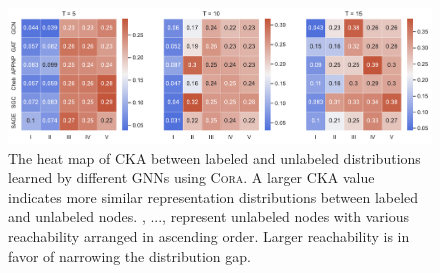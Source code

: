 \documentclass[letterpaper]{article} %
\newcommand{\roma}[1]{\uppercase\expandafter{\romannumeral#1}}
\begin{document}
\begin{figure}[!ht]
	\centering
    \includegraphics[width=0.95\linewidth]{figs/cka.pdf}
    \caption{The heat map of CKA between labeled and unlabeled distributions learned by different GNNs using \textsc{Cora}. A larger CKA value indicates more similar representation distributions between labeled and unlabeled nodes. \roma{1}, ..., \roma{5} represent unlabeled nodes with various reachability arranged in ascending order. Larger reachability is in favor of narrowing the distribution gap.}
    \label{fig:cka}
\end{figure}
\end{document}
